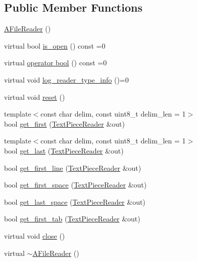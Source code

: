 \subsection*{Public Member Functions}
\begin{DoxyCompactItemize}
\item 
\hyperlink{classuva_1_1utils_1_1file_1_1_a_file_reader_af53fa27556a9ba9b73e61d3d0b9b389d}{A\+File\+Reader} ()
\item 
virtual bool \hyperlink{classuva_1_1utils_1_1file_1_1_a_file_reader_a6c6d0a0bb7f0dd31a5bcd70bc20bd0a7}{is\+\_\+open} () const  =0
\item 
virtual \hyperlink{classuva_1_1utils_1_1file_1_1_a_file_reader_a4f07651f631a39b6986a5dd1c8038fad}{operator bool} () const  =0
\item 
virtual void \hyperlink{classuva_1_1utils_1_1file_1_1_a_file_reader_ae926b8134a16afe7737f96b9b43d9617}{log\+\_\+reader\+\_\+type\+\_\+info} ()=0
\item 
virtual void \hyperlink{classuva_1_1utils_1_1file_1_1_a_file_reader_aa64e141a32fb90a3310e3e87b774e6bd}{reset} ()
\item 
{\footnotesize template$<$const char delim, const uint8\+\_\+t delim\+\_\+len = 1$>$ }\\bool \hyperlink{classuva_1_1utils_1_1file_1_1_a_file_reader_a08a0832f6436e8358b07bd4265a46cb7}{get\+\_\+first} (\hyperlink{classuva_1_1utils_1_1file_1_1_text_piece_reader}{Text\+Piece\+Reader} \&out)
\item 
{\footnotesize template$<$const char delim, const uint8\+\_\+t delim\+\_\+len = 1$>$ }\\bool \hyperlink{classuva_1_1utils_1_1file_1_1_a_file_reader_a74a85a281aa7f67e975b2644470a82de}{get\+\_\+last} (\hyperlink{classuva_1_1utils_1_1file_1_1_text_piece_reader}{Text\+Piece\+Reader} \&out)
\item 
bool \hyperlink{classuva_1_1utils_1_1file_1_1_a_file_reader_a4cdb4034964642f302684d9866f847cd}{get\+\_\+first\+\_\+line} (\hyperlink{classuva_1_1utils_1_1file_1_1_text_piece_reader}{Text\+Piece\+Reader} \&out)
\item 
bool \hyperlink{classuva_1_1utils_1_1file_1_1_a_file_reader_a71563aea9810258a4478d59d81def247}{get\+\_\+first\+\_\+space} (\hyperlink{classuva_1_1utils_1_1file_1_1_text_piece_reader}{Text\+Piece\+Reader} \&out)
\item 
bool \hyperlink{classuva_1_1utils_1_1file_1_1_a_file_reader_ab83626bb2d19ea3f38bc281f40d0fd87}{get\+\_\+last\+\_\+space} (\hyperlink{classuva_1_1utils_1_1file_1_1_text_piece_reader}{Text\+Piece\+Reader} \&out)
\item 
bool \hyperlink{classuva_1_1utils_1_1file_1_1_a_file_reader_a561c77679900c8f2565fb8e384ff568d}{get\+\_\+first\+\_\+tab} (\hyperlink{classuva_1_1utils_1_1file_1_1_text_piece_reader}{Text\+Piece\+Reader} \&out)
\item 
virtual void \hyperlink{classuva_1_1utils_1_1file_1_1_a_file_reader_a115d9fc0bdca0ca2b03d8f0f997628c0}{close} ()
\item 
virtual \hyperlink{classuva_1_1utils_1_1file_1_1_a_file_reader_ae1b202979fc8ba3bd6de437d77c6fe51}{$\sim$\+A\+File\+Reader} ()
\end{DoxyCompactItemize}

